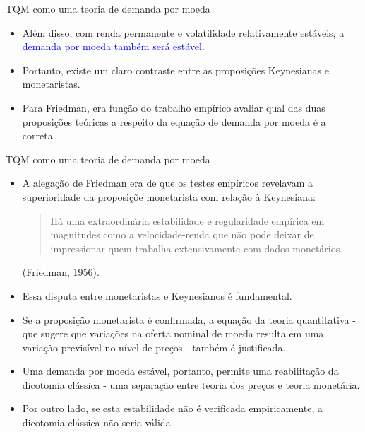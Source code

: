 \documentclass[10pt]{beamer}
\begin{document}
\begin{frame}{TQM como uma teoria de demanda por moeda}
    \begin{itemize}
        \item Além disso, com renda permanente e volatilidade relativamente estáveis, a \textcolor{blue}{demanda por moeda também será estável}.
        \bigskip
        \item Portanto, existe um claro contraste entre as proposições Keynesianas e monetaristas.
        \bigskip
        \item Para Friedman, era função do trabalho empírico avaliar qual das duas proposições teóricas a respeito da equação de demanda por moeda é a correta.
    \end{itemize}
\end{frame}

\begin{frame}{TQM como uma teoria de demanda por moeda}
    \begin{itemize}
        \item A alegação de Friedman era de que os testes empíricos revelavam a superioridade da proposiçõe monetarista com relação à Keynesiana:
        \begin{quote}
            Há uma extraordinária estabilidade e regularidade empírica em magnitudes como a velocidade-renda que não pode deixar de impressionar quem trabalha extensivamente com dados monetários.
        \end{quote}
        \begin{flushright}
            (Friedman, 1956).
        \end{flushright}
        \bigskip
        \item Essa disputa entre monetaristas e Keynesianos é fundamental.
        \bigskip
        \item Se a proposição monetarista é confirmada, a equação da teoria quantitativa - que sugere que variações na oferta nominal de moeda resulta em uma variação previsível no nível de preços - também é justificada.
        \bigskip
        \item Uma demanda por moeda estável, portanto, permite uma reabilitação da dicotomia clássica - uma separação entre teoria dos preços e teoria monetária.
        \bigskip
        \item Por outro lado, se esta estabilidade não é verificada empiricamente, a dicotomia clássica não seria válida.
    \end{itemize}
\end{frame}
\end{document}
